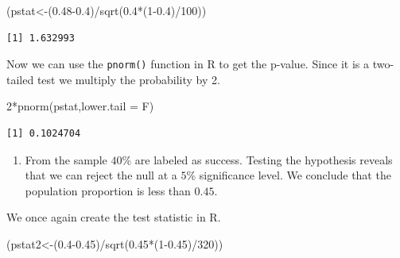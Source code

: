 \documentclass[
  letterpaper,
  DIV=11,
  numbers=noendperiod]{scrreprt}
\newenvironment{Shaded}{\begin{snugshade}}{\end{snugshade}}
\newcommand{\AttributeTok}[1]{\textcolor[rgb]{0.40,0.45,0.13}{#1}}
\newcommand{\DecValTok}[1]{\textcolor[rgb]{0.68,0.00,0.00}{#1}}
\newcommand{\FloatTok}[1]{\textcolor[rgb]{0.68,0.00,0.00}{#1}}
\newcommand{\FunctionTok}[1]{\textcolor[rgb]{0.28,0.35,0.67}{#1}}
\newcommand{\NormalTok}[1]{\textcolor[rgb]{0.00,0.23,0.31}{#1}}
\newcommand{\OtherTok}[1]{\textcolor[rgb]{0.00,0.23,0.31}{#1}}
\newcommand{\SpecialCharTok}[1]{\textcolor[rgb]{0.37,0.37,0.37}{#1}}
\providecommand{\tightlist}{%
  \setlength{\itemsep}{0pt}\setlength{\parskip}{0pt}}\usepackage{longtable,booktabs,array}
\begin{document}
\begin{Shaded}
\begin{Highlighting}[numbers=left,,]
\NormalTok{(pstat}\OtherTok{\textless{}{-}}\NormalTok{(}\FloatTok{0.48{-}0.4}\NormalTok{)}\SpecialCharTok{/}\FunctionTok{sqrt}\NormalTok{(}\FloatTok{0.4}\SpecialCharTok{*}\NormalTok{(}\DecValTok{1}\FloatTok{{-}0.4}\NormalTok{)}\SpecialCharTok{/}\DecValTok{100}\NormalTok{))}
\end{Highlighting}
\end{Shaded}

\begin{verbatim}
[1] 1.632993
\end{verbatim}

Now we can use the \texttt{pnorm()} function in R to get the p-value.
Since it is a two-tailed test we multiply the probability by 2.

\begin{Shaded}
\begin{Highlighting}[numbers=left,,]
\DecValTok{2}\SpecialCharTok{*}\FunctionTok{pnorm}\NormalTok{(pstat,}\AttributeTok{lower.tail =}\NormalTok{ F)}
\end{Highlighting}
\end{Shaded}

\begin{verbatim}
[1] 0.1024704
\end{verbatim}

\begin{blackbox}

\begin{enumerate}
\def\labelenumi{\arabic{enumi}.}
\setcounter{enumi}{1}
\tightlist
\item
  From the sample \(40\)\% are labeled as success. Testing the
  hypothesis reveals that we can reject the null at a \(5\)\%
  significance level. We conclude that the population proportion is less
  than \(0.45\).
\end{enumerate}

\end{blackbox}

We once again create the test statistic in R.

\begin{Shaded}
\begin{Highlighting}[numbers=left,,]
\NormalTok{(pstat2}\OtherTok{\textless{}{-}}\NormalTok{(}\FloatTok{0.4{-}0.45}\NormalTok{)}\SpecialCharTok{/}\FunctionTok{sqrt}\NormalTok{(}\FloatTok{0.45}\SpecialCharTok{*}\NormalTok{(}\DecValTok{1}\FloatTok{{-}0.45}\NormalTok{)}\SpecialCharTok{/}\DecValTok{320}\NormalTok{))}
\end{Highlighting}
\end{Shaded}
\end{document}
